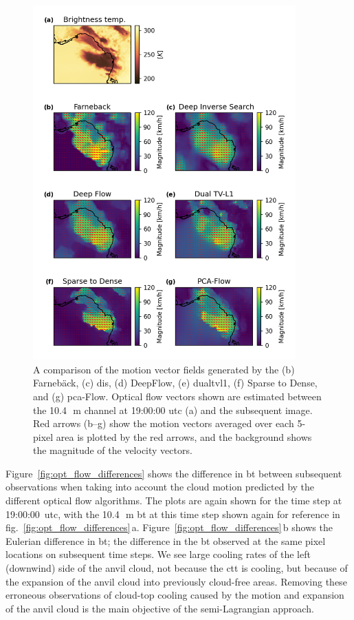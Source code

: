 \begin{figure}[tp]
    \centering
    \includegraphics[width=0.9\textwidth]{figures/chapter1_10.png}
    \caption[
    A comparison of the motion vector fields generated by different optical flow methods
    ]{
    A comparison of the motion vector fields generated by the (b) Farnebäck, (c) \acrshort{dis}, (d) DeepFlow, (e) \acrshort{dualtvl1}, (f) Sparse to Dense, and (g) \acrshort{pca}-Flow. Optical flow vectors shown are estimated between the 10.4\,\unit{\mu m} channel at 19:00:00 \acrshort{utc} (a) and the subsequent image. Red arrows (b--g) show the motion vectors averaged over each 5-pixel area is plotted by the red arrows, and the background shows the magnitude of the velocity vectors.
    }
    \label{fig:opt_flow_comparison}
\end{figure}


Figure~\ref{fig:opt_flow_differences} shows the difference in \acrshort{bt} between subsequent observations when taking into account the cloud motion predicted by the different optical flow algorithms.
The plots are again shown for the time step at 19:00:00~\acrshort{utc}, with the 10.4\,\unit{\mu m} \acrshort{bt} at this time step shown again for reference in fig.~\ref{fig:opt_flow_differences}\,a.
Figure~\ref{fig:opt_flow_differences}\,b shows the Eulerian difference in \acrshort{bt}; the difference in the \acrshort{bt} observed at the same pixel locations on subsequent time steps.
We see large cooling rates of the left (downwind) side of the anvil cloud, not because the \acrshort{ctt} is cooling, but because of the expansion of the anvil cloud into previously cloud-free areas.
Removing these erroneous observations of cloud-top cooling caused by the motion and expansion of the anvil cloud is the main objective of the semi-Lagrangian approach.


